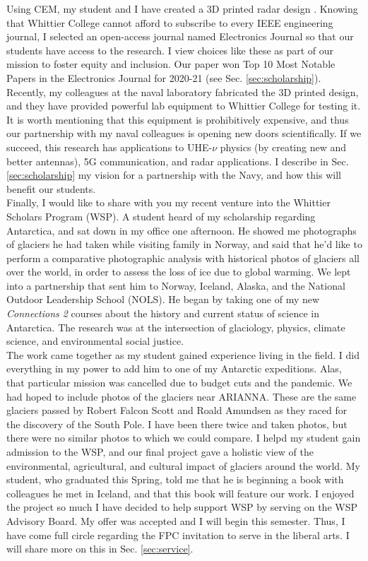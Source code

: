 \documentclass[../../main.tex]{subfiles}
\begin{document}
Using CEM, my student and I have created a 3D printed radar design \cite{10.1016/j.cpc.2009.11.008}.  Knowing that Whittier College cannot afford to subscribe to every IEEE engineering journal, I selected an open-access journal named Electronics Journal so that our students have access to the research.  I view choices like these as part of our mission to foster equity and inclusion.  Our paper won Top 10 Most Notable Papers in the Electronics Journal for 2020-21 (see Sec. \ref{sec:scholarship}).  Recently, my colleagues at the naval laboratory fabricated the 3D printed design, and they have provided powerful lab equipment to Whittier College for testing it.  It is worth mentioning that this equipment is prohibitively expensive, and thus our partnership with my naval colleagues is opening new doors scientifically.  If we succeed, this research has applications to UHE-$\nu$ physics (by creating new and better antennas), 5G communication, and radar applications.  I describe in Sec. \ref{sec:scholarship} my vision for a partnership with the Navy, and how this will benefit our students.
\\
\vspace{0.25cm}
Finally, I would like to share with you my recent venture into the Whittier Scholars Program (WSP).  A student heard of my scholarship regarding Antarctica, and sat down in my office one afternoon.  He showed me photographs of glaciers he had taken while visiting family in Norway, and said that he'd like to perform a comparative photographic analysis with historical photos of glaciers all over the world, in order to assess the loss of ice due to global warming.  We lept into a partnership that sent him to Norway, Iceland, Alaska, and the National Outdoor Leadership School (NOLS).  He began by taking one of my new \textit{Connections 2} courses about the history and current status of science in Antarctica.  The research was at the intersection of glaciology, physics, climate science, and environmental social justice.
\\
\vspace{0.25cm}
The work came together as my student gained experience living in the field.  I did everything in my power to add him to one of my Antarctic expeditions.  Alas, that particular mission was cancelled due to budget cuts and the pandemic.  We had hoped to include photos of the glaciers near ARIANNA.  These are the same glaciers passed by Robert Falcon Scott and Roald Amundsen as they raced for the discovery of the South Pole.  I have been there twice and taken photos, but there were no similar photos to which we could compare.  I helpd my student gain admission to the WSP, and our final project gave a holistic view of the environmental, agricultural, and cultural impact of glaciers around the world.  My student, who graduated this Spring, told me that he is beginning a book with colleagues he met in Iceland, and that this book will feature our work.  I enjoyed the project so much I have decided to help support WSP by serving on the WSP Advisory Board.  My offer was accepted and I will begin this semester.  Thus, I have come full circle regarding the FPC invitation to serve in the liberal arts.  I will share more on this in Sec. \ref{sec:service}.
\end{document}
